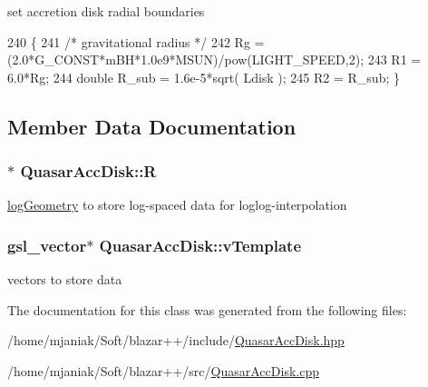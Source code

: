 set accretion disk radial boundaries 
\begin{DoxyCode}
240                                \{
241   \textcolor{comment}{/* gravitational radius */}
242   Rg = (2.0*G\_CONST*mBH*1.0e9*MSUN)/pow(LIGHT\_SPEED,2);
243   R1 = 6.0*Rg;
244   \textcolor{keywordtype}{double} R\_sub = 1.6e-5*sqrt( Ldisk );
245   R2 = R\_sub; \}
\end{DoxyCode}


\subsection{Member Data Documentation}
\hypertarget{classQuasarAccDisk_a470359d2a40c176d5eef36a7bf2fc5bf}{
\subsubsection[{R}]{$\ast$ Quasar\-Acc\-Disk\-::\-R}}\label{classQuasarAccDisk_a470359d2a40c176d5eef36a7bf2fc5bf}
\hyperlink{classlogGeometry}{log\-Geometry} to store log-\/spaced data for loglog-\/interpolation \hypertarget{classQuasarAccDisk_a9ec136403f3df7f3a2582968a28fdfcb}{
\subsubsection[{v\-Template}]{\setlength{\rightskip}{0pt plus 5cm}gsl\-\_\-vector$\ast$ Quasar\-Acc\-Disk\-::v\-Template}}\label{classQuasarAccDisk_a9ec136403f3df7f3a2582968a28fdfcb}
vectors to store data 

The documentation for this class was generated from the following files\-:\begin{DoxyCompactItemize}
\item 
/home/mjaniak/\-Soft/blazar++/include/\hyperlink{QuasarAccDisk_8hpp}{Quasar\-Acc\-Disk.\-hpp}\item 
/home/mjaniak/\-Soft/blazar++/src/\hyperlink{QuasarAccDisk_8cpp}{Quasar\-Acc\-Disk.\-cpp}\end{DoxyCompactItemize}

